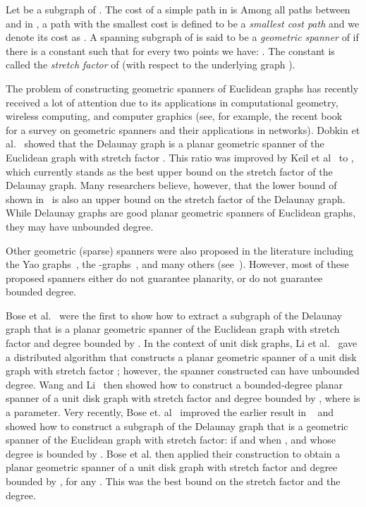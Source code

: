 \documentclass{stacs_proc}
\theoremstyle{plain}\newtheorem{satz}[thm]{Satz}
\begin{document}
Let  be a subgraph of . The cost of a simple path  in  is  Among
all paths between  and  in , a path with the smallest cost
is defined to be a {\em smallest cost path} and we denote its cost
as . A spanning subgraph  of  is said to be a {\em geometric
spanner} of  if there is a constant  such that for every
two points  we have: .
The constant  is called the {\em stretch factor} of  (with
respect to the underlying graph ).

The problem of constructing geometric spanners of Euclidean graphs has
recently received a lot of attention due to its applications in
computational geometry, wireless computing, and computer graphics
(see, for example, the recent book~\cite{spannerbook} for a survey on
geometric spanners and their applications in networks). Dobkin et
al.~\cite{dobkin} showed that the Delaunay graph is a planar
geometric spanner of the Euclidean graph with stretch factor
. This ratio was improved by
Keil et al~\cite{keil} to , which currently stands as the best upper bound on the stretch
factor of the Delaunay graph. Many researchers believe, however, that
the lower bound of  shown in~\cite{chew} is also an upper
bound on the stretch factor of the Delaunay graph. While
Delaunay graphs are good planar geometric spanners of Euclidean
graphs, they may have unbounded degree. 

Other geometric (sparse) spanners were also proposed in the literature
including the Yao graphs~\cite{yao}, the -graphs~\cite{keil},
and many others (see~\cite{spannerbook}). However, most of these proposed
spanners either do not guarantee planarity, or do not guarantee bounded
degree.

Bose et al.~\cite{boseesa,bosealgorithmica} were the first to show
how to extract a subgraph of the Delaunay graph that is a planar
geometric spanner of the Euclidean graph with
stretch factor  and degree bounded by . In the
context of unit disk graphs, Li et
al.~\cite{iitunbounded1,iitunbounded} gave a distributed algorithm
that constructs a planar geometric spanner of a unit disk graph with
stretch factor ; however, the spanner constructed can have
unbounded degree. Wang and Li~\cite{iitbounded1,iitbounded} then
showed how to construct a bounded-degree planar spanner of a unit
disk graph with stretch factor  and degree bounded by , where  is a parameter. Very
recently, Bose et. al~\cite{bose1} improved the earlier result in
~\cite{boseesa,bosealgorithmica} and showed how to construct a
subgraph of the Delaunay graph that is a geometric spanner of the
Euclidean graph with stretch factor:  if  and  when , and whose degree is bounded by . Bose et al. then applied their construction to obtain
a planar geometric spanner of a unit disk graph with stretch factor
 and degree
bounded by , for any . This
was the best bound on the stretch factor and the degree.
\end{document}
